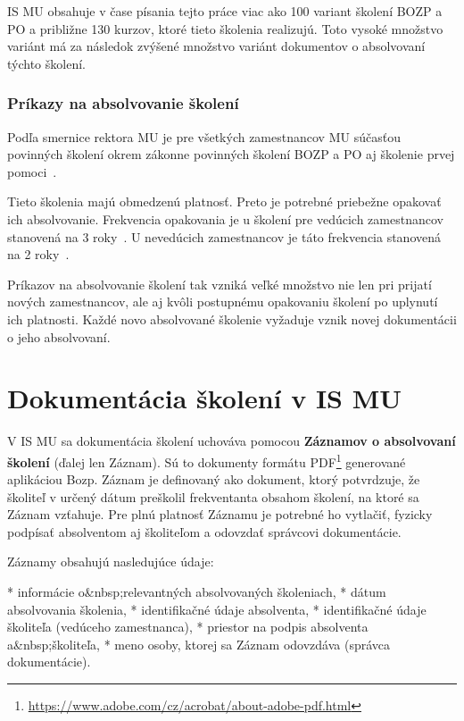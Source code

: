 \documentclass[
  digital,     %
  oneside,     %
  nosansbold,  %
  nocolorbold, %
  lof,         %
  nolot,         %
]{fithesis4}
\begin{document}
IS MU obsahuje v čase písania tejto práce viac ako 100 variant školení BOZP a PO a približne 130 kurzov, ktoré tieto školenia realizujú. Toto vysoké množstvo variánt má za následok zvýšené množstvo variánt dokumentov o absolvovaní týchto školení.

\subsection*{Príkazy na absolvovanie školení}
Podľa smernice rektora MU je pre všetkých zamestnancov MU súčasťou povinných školení okrem zákonne povinných školení BOZP a PO aj školenie prvej pomoci~\cites[sekcia~3.2.1,~bod~3.]{smernice_rektora_bozp}.

Tieto školenia majú obmedzenú platnosť. Preto je potrebné priebežne opakovať ich absolvovanie. Frekvencia opakovania je u školení pre vedúcich zamestnancov stanovená na 3 roky~\cites[sekcia~3.2.4,~bod~b)]{smernice_rektora_bozp}[čl.~4,~odst.~2~bod~c)]{smernice_mu_po}. U nevedúcich zamestnancov je táto frekvencia stanovená na 2 roky~\cites[sekcia~3.2.2,~bod~1.]{smernice_rektora_bozp}[čl.~10,~odst.~2]{smernice_mu_po}.

Príkazov na absolvovanie školení tak vzniká veľké množstvo nie len pri prijatí nových zamestnancov, ale aj kvôli postupnému opakovaniu školení po uplynutí ich platnosti. Každé novo absolvované školenie vyžaduje vznik novej dokumentácii o jeho absolvovaní.

\chapter{Dokumentácia školení v IS MU}
\label{kap-3}
V IS MU sa dokumentácia školení uchováva pomocou \textbf{Záznamov o absolvovaní školení} (ďalej len Záznam). Sú to dokumenty formátu PDF\footnote{\url{https://www.adobe.com/cz/acrobat/about-adobe-pdf.html}} generované aplikáciou Bozp. Záznam je definovaný ako dokument, ktorý potvrdzuje, že školiteľ v určený dátum preškolil frekventanta obsahom školení, na ktoré sa Záznam vzťahuje. Pre plnú platnosť Záznamu je potrebné ho vytlačiť, fyzicky podpísať absolventom aj školiteľom a odovzdať správcovi dokumentácie.

Záznamy obsahujú nasledujúce údaje:

\begin{markdown}
  * informácie o&nbsp;relevantných absolvovaných školeniach,
  * dátum absolvovania školenia,
  * identifikačné údaje absolventa,
  * identifikačné údaje školiteľa (vedúceho zamestnanca),
  * priestor na podpis absolventa a&nbsp;školiteľa,
  * meno osoby, ktorej sa Záznam odovzdáva (správca dokumentácie).
\end{markdown}
\end{document}
